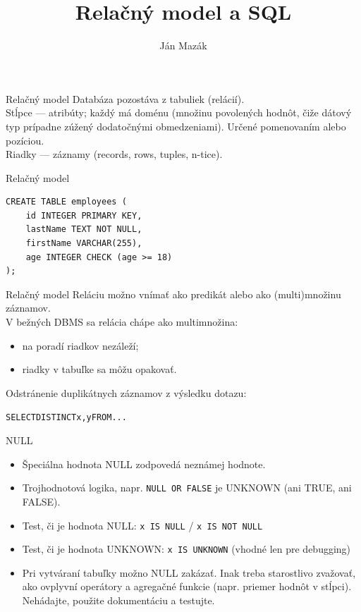 \documentclass[12pt]{beamer}
\title{Relačný model a SQL}
\author{Ján Mazák}
\institute{FMFI UK Bratislava}
\date{}
\begin{document}
\frame{\titlepage}

\begin{frame}{Relačný model}
Databáza pozostáva z tabuliek (\alert{relácií}).\\[3mm]

Stĺpce --- \alert{atribúty}; každý má doménu (množinu povolených hodnôt, čiže dátový typ prípadne zúžený dodatočnými obmedzeniami). Určené pomenovaním alebo pozíciou.\\[3mm]

Riadky --- \alert{záznamy} (records, rows, tuples, n-tice).
\end{frame}

\begin{frame}[fragile]{Relačný model}
\begin{verbatim}
CREATE TABLE employees (
    id INTEGER PRIMARY KEY,
    lastName TEXT NOT NULL,
    firstName VARCHAR(255),
    age INTEGER CHECK (age >= 18)
);
\end{verbatim}
\end{frame}

\begin{frame}{Relačný model}
Reláciu možno vnímať ako predikát alebo ako (multi)množinu záznamov.\\[3mm]

V bežných DBMS sa relácia chápe ako multimnožina:
\begin{itemize}
\item na poradí riadkov nezáleží;
\item riadky v tabuľke sa môžu opakovať.
\end{itemize}

Odstránenie duplikátnych záznamov z výsledku dotazu:
\begin{alltt}
    SELECT \alert{DISTINCT} x, y FROM ...
\end{alltt}
\end{frame}

\begin{frame}[fragile]{NULL}
\begin{itemize}
\item Špeciálna hodnota \alert{NULL} zodpovedá neznámej hodnote.
\item Trojhodnotová logika, napr. \verb|NULL OR FALSE| je UNKNOWN (ani TRUE, ani FALSE).
\item Test, či je hodnota NULL: \verb|x IS NULL| / \verb|x IS NOT NULL|
\item Test, či je hodnota UNKNOWN: \verb|x IS UNKNOWN| (vhodné len pre debugging)
\item Pri vytváraní tabuľky možno NULL zakázať.
Inak treba starostlivo zvažovať, ako ovplyvní operátory a agregačné funkcie (napr. priemer hodnôt v stĺpci).
Nehádajte, použite dokumentáciu a testujte.
\end{itemize}
\end{frame}
\end{document}

